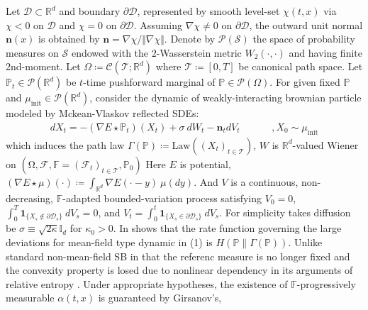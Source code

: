 \documentclass[10pt,a4paper]{article}
\begin{document}
Let $\displaystyle \mathcal{D} \subset \mathbb{R}^{d}$ and boundary $\displaystyle \partial \mathcal{D}$, represented by smooth level-set $\displaystyle \chi ( t,x)$ via $\displaystyle \mathcal{\chi } < 0$ on $\displaystyle \mathcal{D}$ and $\displaystyle \chi =0$ on $\displaystyle \partial \mathcal{D}$. Assuming $\displaystyle \nabla \chi \neq 0$ on $\displaystyle \partial \mathcal{D}$, the outward unit normal $\displaystyle \mathbf{n}( x)$ is obtained by $\displaystyle \mathbf{n} =\nabla \chi /\Vert \nabla \chi \Vert $. Denote by $\mathscr{P} (\mathcal{S} )$ the space of probability measures on $\mathcal{S}$ endowed with the $2$-Wasserstein metric $W_{2} (\cdot ,\cdot )$ and having finite 2nd-moment. Let $\displaystyle \Omega \coloneq \mathcal{C} (\mathcal{T} ;\mathbb{R}^{d} )$ where $\displaystyle \mathcal{T} \coloneq [ 0,T]$ be canonical path space. Let $\displaystyle \mathbb{P}_{t} \in \mathscr{P} (\mathbb{R}^{d} )$ be $\displaystyle t$-time pushforward marginal of $\displaystyle \mathbb{P} \in \mathscr{P} (\Omega )$. For given fixed $\displaystyle \mathbb{P}$ and $\displaystyle \mu _{\text{init}} \in \mathscr{P} (\mathbb{R}^{d} )$, consider the dynamic of weakly-interacting brownian particle modeled by Mckean-Vlaskov reflected SDEs: \ 
\begin{equation}
 \begin{aligned}
dX_{t} =-\textstyle ( \nabla E\star \mathbb{P}_{t})( X_{t}) +\sigma \ dW_{t} -\mathbf{n}_{t} dV_{t} & &  & & ,X_{0} \sim \mu _{\text{init}}
\end{aligned}
\end{equation}which induces the path law $\displaystyle \Gamma (\mathbb{P}) \coloneq \text{Law}\left(( X_{t})_{t\in \mathcal{T}}\right)$, $\displaystyle W$ is $\displaystyle \mathbb{R}^{d}$-valued Wiener on $\displaystyle (\si{\ohm},\mathcal{F} ,\mathbb{F} =(\mathcal{F}_{t} )_{t\in \mathcal{T}} ,\mathbb{P}_{0} )$ Here $\displaystyle E$ is potential, $\displaystyle {\textstyle ( \nabla E\star \mu )( \cdot ) \coloneq \int _{\mathbb{R}^{d}} \nabla E(\cdot -y)\ \mu (dy).}$ And $V$ is a continuous, non-decreasing, $\displaystyle \mathbb{F}$-adapted bounded-variation process satisfying $\displaystyle {\textstyle V_{0} =0}$, $\displaystyle {\textstyle \int _{0}^{T}\mathbf{1}_{\{X_{s} \notin \partial \mathcal{D}_{s} \}} \ dV_{s} =0}$, and $\displaystyle {\textstyle V_{t} =\int _{0}^{t}\mathbf{1}_{\{X_{s} \in \partial \mathcal{D}_{s} \}} \ dV_{s}}$. For simplicity takes diffusion be $\displaystyle \sigma \equiv \sqrt{2\kappa }\mathbb{I}_{d}$ for $\displaystyle \kappa _{0}  >0$. In \cite{} shows that the rate function governing the large deviations for mean-field type dynamic in (1) is $H(\mathbb{P} \parallel \Gamma (\mathbb{P} ))$. Unlike standard non-mean-field SB in that the referenc measure is no longer fixed and the convexity property is losed due to nonlinear dependency in its arguments of relative entropy \cite{}. Under appropriate hypotheses, the existence of $\displaystyle \mathbb{F}$-progressively measurable $\displaystyle \alpha ( t,x)$ is guaranteed by Girsanov's, 
\end{document}
